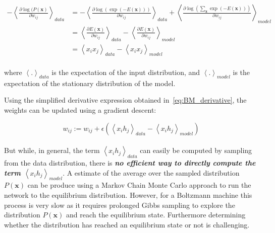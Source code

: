 \documentclass[a4paper,11pt]{report}
\newcommand{\Important}[1]{\textbf{{\em #1}}}
\begin{document}
		\begin{equation}
			\begin{split}
				- \left\langle \frac{\partial \log(P(\mathbf{x})}{\partial w_{ij}} \right\rangle_{data} 
										&= - \left\langle \frac{\partial \log(\exp(-E(\mathbf{x})))} {\partial {w_{ij}}} \right\rangle_{data} 
											+ \left\langle \frac{\partial \log\left(\sum_{\mathbf{x}}{\exp(-E(\mathbf{x}))}\right)}{\partial w_{ij}} \right\rangle_{model}\\
										&= \left\langle \frac{\partial E(\mathbf{x})} {\partial {w_{ij}}} \right\rangle_{data}
											- \left\langle \frac{\partial E(\mathbf{x})}{\partial w_{ij}} \right\rangle_{model} \\
										&= \left\langle x_{i}x_{j} \right\rangle_{data} - \left\langle x_{i}x_{j} \right\rangle_{model}
			\end{split}
			\label{eq:BM_derivative}
		\end{equation}\\  
    
		where $\left\langle.\right\rangle_{data}$ is the expectation of the input distribution, and $\left\langle.\right\rangle_{model}$ is the expectation of the stationary distribution of the model.\\\par
    
		Using the simplified derivative expression obtained in~\ref{eq:BM_derivative}, the weights can be updated using a gradient descent:
		
		\begin{equation}
			w_{ij} := w_{ij} + \epsilon \left( \left\langle x_{i}h_{j} \right\rangle_{data} - \left\langle x_{i}h_{j} \right\rangle_{model} \right)
			\label{eq:BM weight update}
		\end{equation}\\

		But while, in general, the term $\left\langle x_{i}h_{j} \right\rangle_{data}$ can easily be computed by sampling from the data distribution, there is \Important{no efficient way to directly compute the term $\left\langle x_{i}h_{j} \right\rangle_{model}$}. A estimate of the average over the sampled distribution $P(\mathbf{x})$ can be produce using a Markov Chain Monte Carlo approach to run the network to the equilibrium distribution. However, for a Boltzmann machine this process is very slow as it requires prolonged Gibbs sampling to explore the distribution $P(\mathbf{x})$ and reach the equilibrium state. Furthermore determining whether the distribution has reached an equilibrium state or not is challenging.
		
\end{document}
